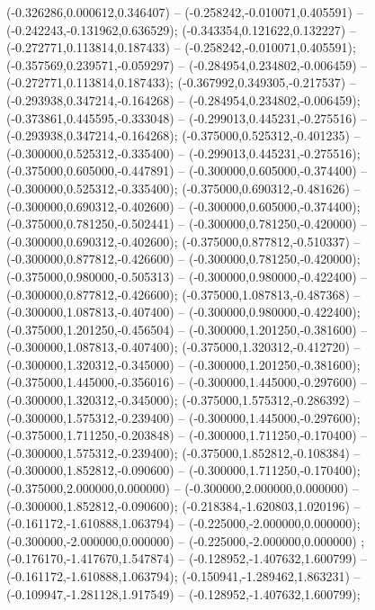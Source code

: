  (-0.326286,0.000612,0.346407) -- (-0.258242,-0.010071,0.405591) -- (-0.242243,-0.131962,0.636529);
 (-0.343354,0.121622,0.132227) -- (-0.272771,0.113814,0.187433) -- (-0.258242,-0.010071,0.405591);
 (-0.357569,0.239571,-0.059297) -- (-0.284954,0.234802,-0.006459) -- (-0.272771,0.113814,0.187433);
 (-0.367992,0.349305,-0.217537) -- (-0.293938,0.347214,-0.164268) -- (-0.284954,0.234802,-0.006459);
 (-0.373861,0.445595,-0.333048) -- (-0.299013,0.445231,-0.275516) -- (-0.293938,0.347214,-0.164268);
 (-0.375000,0.525312,-0.401235) -- (-0.300000,0.525312,-0.335400) -- (-0.299013,0.445231,-0.275516);
 (-0.375000,0.605000,-0.447891) -- (-0.300000,0.605000,-0.374400) -- (-0.300000,0.525312,-0.335400);
 (-0.375000,0.690312,-0.481626) -- (-0.300000,0.690312,-0.402600) -- (-0.300000,0.605000,-0.374400);
 (-0.375000,0.781250,-0.502441) -- (-0.300000,0.781250,-0.420000) -- (-0.300000,0.690312,-0.402600);
 (-0.375000,0.877812,-0.510337) -- (-0.300000,0.877812,-0.426600) -- (-0.300000,0.781250,-0.420000);
 (-0.375000,0.980000,-0.505313) -- (-0.300000,0.980000,-0.422400) -- (-0.300000,0.877812,-0.426600);
 (-0.375000,1.087813,-0.487368) -- (-0.300000,1.087813,-0.407400) -- (-0.300000,0.980000,-0.422400);
 (-0.375000,1.201250,-0.456504) -- (-0.300000,1.201250,-0.381600) -- (-0.300000,1.087813,-0.407400);
 (-0.375000,1.320312,-0.412720) -- (-0.300000,1.320312,-0.345000) -- (-0.300000,1.201250,-0.381600);
 (-0.375000,1.445000,-0.356016) -- (-0.300000,1.445000,-0.297600) -- (-0.300000,1.320312,-0.345000);
 (-0.375000,1.575312,-0.286392) -- (-0.300000,1.575312,-0.239400) -- (-0.300000,1.445000,-0.297600);
 (-0.375000,1.711250,-0.203848) -- (-0.300000,1.711250,-0.170400) -- (-0.300000,1.575312,-0.239400);
 (-0.375000,1.852812,-0.108384) -- (-0.300000,1.852812,-0.090600) -- (-0.300000,1.711250,-0.170400);
 (-0.375000,2.000000,0.000000) -- (-0.300000,2.000000,0.000000) -- (-0.300000,1.852812,-0.090600);
 (-0.218384,-1.620803,1.020196) -- (-0.161172,-1.610888,1.063794) -- (-0.225000,-2.000000,0.000000);
 (-0.300000,-2.000000,0.000000) -- (-0.225000,-2.000000,0.000000) ;
 (-0.176170,-1.417670,1.547874) -- (-0.128952,-1.407632,1.600799) -- (-0.161172,-1.610888,1.063794);
 (-0.150941,-1.289462,1.863231) -- (-0.109947,-1.281128,1.917549) -- (-0.128952,-1.407632,1.600799);
